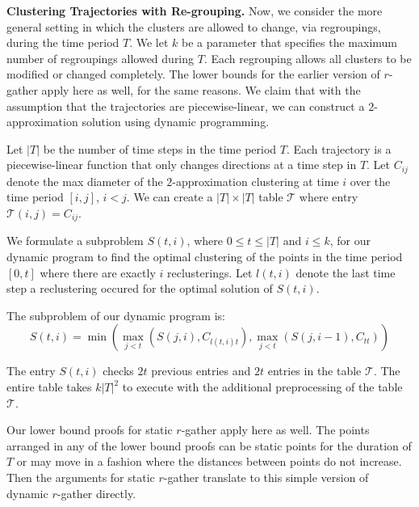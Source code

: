 \medskip\noindent\textbf{Clustering Trajectories with Re-grouping.} Now, we consider the more general setting in which the clusters are allowed to change, via regroupings, during the time period $T$.  We let $k$ be a parameter that specifies the maximum number of regroupings allowed during $T$.  Each regrouping allows all clusters to be modified or changed completely.  The lower bounds for the earlier version of $r$-gather apply here as well, for the same reasons.  We claim that with the assumption that the trajectories are piecewise-linear, we can construct a $2$-approximation solution using dynamic programming.

Let $|T|$ be the number of time steps in the time period $T$.  Each trajectory is a piecewise-linear function that only changes directions at a time step in $T$.  Let $C_{ij}$ denote the max diameter of the $2$-approximation clustering at time $i$ over the time period $[i,j]$, $i<j$.  We can create a $|T| \times |T|$ table $\mathcal{T}$ where entry $\mathcal{T}(i, j) = C_{ij}$.  

We formulate a subproblem $S(t,i)$, where $0 \leq t \leq |T|$ and $i \leq k$, for our dynamic program to find the optimal clustering of the points in the time period $[0, t]$ where there are exactly $i$ reclusterings.  Let $l(t,i)$ denote the last time step a reclustering occured for the optimal solution of $S(t,i)$.

The subproblem of our dynamic program is:
$$S(t,i) = \min( \max_{j<t}(S(j, i), C_{l(t,i)t}), \max_{j<t}(S(j, i-1), C_{tt}) )$$ 

The entry $S(t,i)$ checks $2t$ previous entries and $2t$ entries in the table $\mathcal{T}$.  The entire table takes $k|T|^2$ to execute with the additional preprocessing of the table $\mathcal{T}$.

Our lower bound proofs for static $r$-gather apply here as well.  The points arranged in any of the lower bound proofs can be static points for the duration of $T$ or may move in a fashion where the 
distances between points do not increase.  Then the arguments for static $r$-gather translate to this simple version of dynamic $r$-gather directly.

